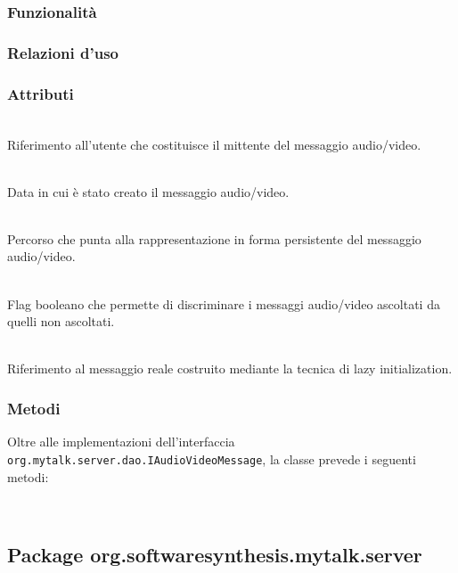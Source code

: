 \subsubsection*{Funzionalità}

\subsubsection*{Relazioni d'uso}

\subsubsection*{Attributi}
\begin{description}
  \item{}\\
Riferimento all'utente che costituisce il mittente del messaggio audio/video.
  \item{}\\
Data in cui è stato creato il messaggio audio/video.
  \item{}\\
Percorso che punta alla rappresentazione in forma persistente del messaggio audio/video.
  \item{}\\
Flag booleano che permette di discriminare i messaggi audio/video ascoltati da quelli non ascoltati.
  \item{}\\
Riferimento al messaggio reale costruito mediante la tecnica di lazy initialization.
\end{description}

\subsubsection*{Metodi}
Oltre alle implementazioni dell'interfaccia \texttt{org.mytalk.server.dao.IAudioVideoMessage}, la classe prevede i seguenti metodi:
\begin{description}
\item{}\\
\end{description}

\subsection{Package org.softwaresynthesis.mytalk.server}\label{sec:server}


